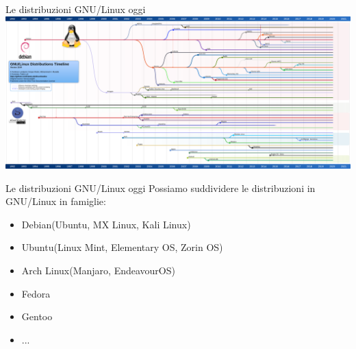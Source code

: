 \begin{frame}{Le distribuzioni GNU/Linux oggi}
    \centering
    \includegraphics[scale=0.18]{images/aygzaivcbmd51.png}
\end{frame}

\begin{frame}{Le distribuzioni GNU/Linux oggi}
Possiamo suddividere le distribuzioni in GNU/Linux in famiglie:
\begin{itemize}
    \item Debian(Ubuntu, MX Linux, Kali Linux)
    \item Ubuntu(Linux Mint, Elementary OS, Zorin OS)
    \item Arch Linux(Manjaro, EndeavourOS)
    \item Fedora
    \item Gentoo
    \item ...
\end{itemize}

\end{frame}

